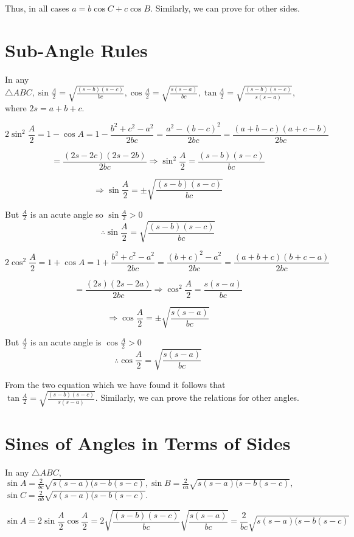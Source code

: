 \noindent Thus, in all cases $a = b\cos C + c\cos B$. Similarly, we can prove for other sides.
\stopproof

\section{Sub-Angle Rules}
\starttheorem
In any $\triangle ABC, \sin\frac{A}{2}= \sqrt{\frac{(s - b)(s - c)}{bc}}, \cos\frac{A}{2} = \sqrt{\frac{s(s - a)}{bc}},
\tan\frac{A}{2} = \sqrt{\frac{(s - b)(s - c)}{s(s - a)}}$, where $2s = a + b + c$.
\stoptheorem

\startproof
$$2\sin^2\frac{A}{2} = 1 - \cos A = 1 - \frac{b^2 + c^2 - a^2}{2bc} = \frac{a^2 - (b - c)^2}{2bc} = \frac{(a + b - c)(a + c -
  b)}{2bc}$$

  $$= \frac{(2s - 2c)(2s - 2b)}{2bc} \Rightarrow \sin^2\frac{A}{2} = \frac{(s - b)(s - c)}{bc}$$

$$\Rightarrow \sin\frac{A}{2} = \pm\sqrt{\frac{(s - b)(s - c)}{bc}}$$

  But $\frac{A}{2}$ is an acute angle so $\sin\frac{A}{2}> 0$ $$\therefore \sin\frac{A}{2} = \sqrt{\frac{(s - b)(s - c)}{bc}}$$

$$2\cos^2\frac{A}{2} = 1 + \cos A = 1 + \frac{b^2 + c^2 - a^2}{2bc} = \frac{(b + c)^2 - a^2}{2bc} = \frac{(a + b + c)(b + c -
  a)}{2bc}$$

  $$= \frac{(2s)(2s - 2a)}{2bc} \Rightarrow \cos^2\frac{A}{2} = \frac{s(s - a)}{bc}$$

  $$\Rightarrow \cos\frac{A}{2} = \pm\sqrt{\frac{s(s - a)}{bc}}$$

  But $\frac{A}{2}$ is an acute angle is $\cos\frac{A}{2} > 0$ $$\therefore \cos\frac{A}{2} = \sqrt{\frac{s(s - a)}{bc}}$$

\noindent From the two equation which we have found it follows that $\tan\frac{A}{2} = \sqrt{\frac{(s - b)(s - c)}{s(s -
    a)}}$. Similarly, we can prove the relations for other angles.
\stopproof

\section{Sines of Angles in Terms of Sides}
\starttheorem
In any $\triangle ABC$, $\sin A = \frac{2}{bc}\sqrt{s(s - a)(s - b(s - c)}, \sin B = \frac{2}{ca}\sqrt{s(s - a)(s - b(s - c)},$
$\sin C = \frac{2}{ab}\sqrt{s(s - a)(s - b(s - c)}$.
\stoptheorem

\startproof
$$\sin A = 2\sin\frac{A}{2}\cos\frac{A}{2} = 2\sqrt{\frac{(s - b)(s - c)}{bc}}\sqrt{\frac{s(s - a)}{bc}} = \frac{2}{bc}\sqrt{s(s
  - a)(s - b(s - c)}$$

